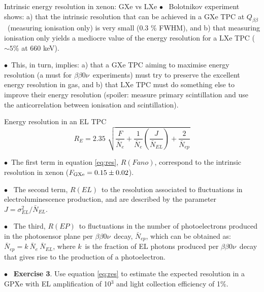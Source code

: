 \documentclass [aspectratio=169]{beamer}
\newcommand{\bbonu}{\ensuremath{\beta\beta0\nu}}
\newcommand{\qbb}{\ensuremath{Q_{\beta\beta}}}
\begin{document}
\begin{frame}{Intrinsic energy resolution in xenon: GXe vs LXe}
$\bullet$~ Bolotnikov experiment shows: a) that the intrinsic resolution that can be achieved in a GXe TPC at \qbb\ (measuring ionisation only) is very small (0.3 \% FWHM), and b) that measuring ionisation only yields a mediocre value of the energy resolution for a LXe TPC ($\sim 5$\% at 660 keV). 

$\bullet$~This, in turn, implies: a) that a GXe TPC aiming to maximise energy resolution (a must for \bbonu\ experiments) must try to preserve the excellent energy resolution in gas, and b) that LXe TPC must do something else to improve their energy resolution (spoiler: measure primary scintillation and use the anticorrelation between ionisation and scintillation).  
\end{frame}
%
\begin{frame}{Energy resolution in an EL TPC}
%
\begin{equation}
 R_E = 2.35 \, \, \sqrt{ \frac{F}{\bar{N}_e}
 + \frac{1}{\bar{N}_e} (\frac{J}{\bar{N}_{EL}}) + \frac{2}{\bar{N}_{ep}}}
 \label{eq:res}
 \end{equation}
%

$\bullet$~The first term in equation \ref{eq:res}, $R(Fano)$, correspond to the intrinsic resolution in xenon ($F_{\rm GXe} = 0.15 \pm 0.02$).

$\bullet$~ The second term, $R(EL)$~to the resolution associated to fluctuations in
electroluminescence production, and are described by the parameter $J = \sigma_{EL}^2/\bar{N}_{EL}$.

$\bullet$~ The third, $R(EP)$~to fluctuations in the number of photoelectrons produced in the photosensor plane per \bbonu\ decay, $\bar{N}_{ep}$, which can be obtained as:
$ \bar{N}_{ep} = k\ \bar{N}_e\ \bar{N}_{EL}$, 
%
where $k$~is the fraction of EL photons produced per \bbonu\ decay that gives rise to the production of a photoelectron. 

$\bullet$~ {\bf Exercise 3}. Use equation \ref{eq:res} to estimate the expected resolution in a GPXe with EL amplification of 10$^3$ and light collection efficiency of 1\%.

\end{frame}
\end{document}
